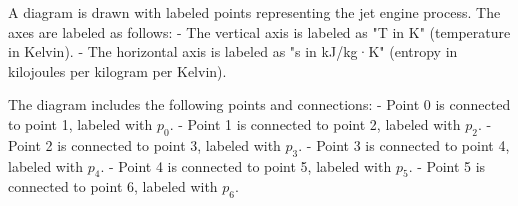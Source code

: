 A diagram is drawn with labeled points representing the jet engine process. The axes are labeled as follows:  
- The vertical axis is labeled as "T in K" (temperature in Kelvin).  
- The horizontal axis is labeled as "s in kJ/kg·K" (entropy in kilojoules per kilogram per Kelvin).  

The diagram includes the following points and connections:  
- Point 0 is connected to point 1, labeled with \( p_0 \).  
- Point 1 is connected to point 2, labeled with \( p_2 \).  
- Point 2 is connected to point 3, labeled with \( p_3 \).  
- Point 3 is connected to point 4, labeled with \( p_4 \).  
- Point 4 is connected to point 5, labeled with \( p_5 \).  
- Point 5 is connected to point 6, labeled with \( p_6 \).